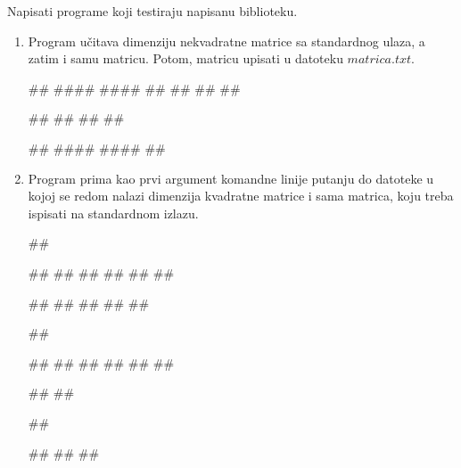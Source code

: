 \begin{Exercise}[label=biblioteka]
Napisati programe koji testiraju napisanu biblioteku.

\begin{enumerate}
\item[(1)] Program učitava dimenziju nekvadratne matrice sa
  standardnog ulaza, a zatim i samu matricu. Potom, matricu upisati u
  datoteku $matrica.txt$.

\begin{miditest}
\begin{upotreba}{1}
#\naslovInt#
####
####
##
##
##
##

##
##
##
##
\end{upotreba}
\end{miditest}
\begin{miditest}
\begin{upotreba}{2}
#\naslovInt#
####
####
##
\end{upotreba}
\end{miditest}

\item[(2)] Program prima kao prvi argument komandne linije putanju do
  datoteke u kojoj se redom nalazi dimenzija kvadratne matrice i sama
  matrica, koju treba ispisati na standardnom izlazu.
  
\begin{minitest}
\begin{test}{1}
##

##  
##
##
##
##
##

#\naslovIzlaz#
##
##
##
##
\end{test}
\end{minitest}
\begin{minitest}
\begin{test}{2}
##

##  
##
##
##
##
##

#\naslovIzlaz#
##
\end{test}
\end{minitest}
\begin{minitest}
\begin{test}{3}
##

#\naslovIzlaz#
##
##
\end{test}
\end{minitest}

\end{enumerate}
\end{Exercise}
